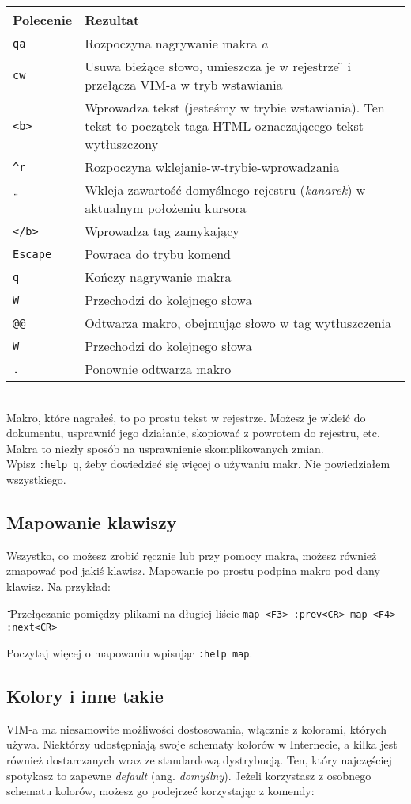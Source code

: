 \documentclass[a4paper,12pt]{article}
\begin{document}
\begin{tabular}{ l | p{} }
{\bf Polecenie} & {\bf Rezultat} \\ \hline
{\tt qa} & Rozpoczyna nagrywanie makra {\it a}\\
{\tt cw} & Usuwa bieżące słowo, umieszcza je w rejestrze \"{} i przełącza VIM-a w tryb wstawiania\\
{\tt <b>} & Wprowadza tekst (jesteśmy w trybie wstawiania). Ten tekst to początek taga HTML oznaczającego tekst wytłuszczony\\
{\tt \^{}r} & Rozpoczyna wklejanie-w-trybie-wprowadzania\\
{\tt \"{}} & Wkleja zawartość domyślnego rejestru ({\it kanarek}) w aktualnym położeniu kursora \\
{\tt </b>} & Wprowadza tag zamykający \\
{\tt Escape} & Powraca do trybu komend \\
{\tt q} & Kończy nagrywanie makra\\
{\tt W} & Przechodzi do kolejnego słowa \\
{\tt @@} & Odtwarza makro, obejmując słowo w tag wytłuszczenia \\
{\tt W} & Przechodzi do kolejnego słowa\\
{\tt .} & Ponownie odtwarza makro\\ \hline
\end{tabular}\\

\noindent
Makro, które nagrałeś, to po prostu tekst w rejestrze. Możesz je wkleić do dokumentu, usprawnić jego działanie, skopiować z powrotem do rejestru, etc. \\Makra to niezły sposób na usprawnienie skomplikowanych zmian.\\
Wpisz {\tt :help q}, żeby dowiedzieć się więcej o używaniu makr. Nie powiedziałem wszystkiego.
\subsection{Mapowanie klawiszy}
Wszystko, co możesz zrobić ręcznie lub przy pomocy makra, możesz również zmapować pod jakiś klawisz. Mapowanie po prostu podpina makro pod dany klawisz. Na przykład:

{\tt \"{}} Przełączanie pomiędzy plikami na długiej liście {\tt map <F3> :prev<CR> map <F4> :next<CR>}

\noindent
Poczytaj więcej o mapowaniu wpisując {\tt :help map}.
\subsection{Kolory i inne takie}
VIM-a ma niesamowite możliwości dostosowania, włącznie z kolorami, których używa. Niektórzy udostępniają swoje schematy kolorów w Internecie, a kilka jest również dostarczanych wraz ze standardową dystrybucją. Ten, który najczęściej spotykasz to zapewne {\it default} (ang. {\it domyślny}). Jeżeli korzystasz z osobnego schematu kolorów, możesz go podejrzeć korzystając z komendy:
\end{document}
